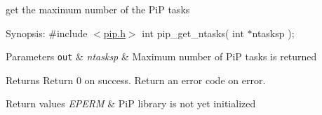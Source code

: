 get the maximum number of the Pi\-P tasks

\begin{DoxyParagraph}{Synopsis\-:}
\#include $<$\hyperlink{pip_8h_source}{pip.\-h}$>$ int pip\-\_\-get\-\_\-ntasks( int $\ast$ntasksp );
\end{DoxyParagraph}

\begin{DoxyParams}[1]{Parameters}
\mbox{\tt out}  & {\em ntasksp} & Maximum number of Pi\-P tasks is returned\\
\hline
\end{DoxyParams}
\begin{DoxyReturn}{Returns}
Return 0 on success. Return an error code on error. 
\end{DoxyReturn}

\begin{DoxyRetVals}{Return values}
{\em E\-P\-E\-R\-M} & Pi\-P library is not yet initialized \\
\hline
\end{DoxyRetVals}
